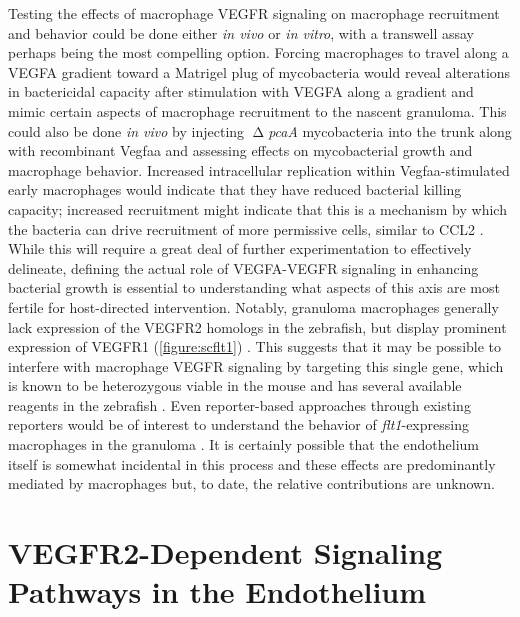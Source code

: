Testing the effects of macrophage VEGFR signaling on macrophage recruitment and behavior could be done either \textit{in vivo} or \textit{in vitro}, with a transwell assay perhaps being the most compelling option. Forcing macrophages to travel along a VEGFA gradient toward a Matrigel plug of mycobacteria would reveal alterations in bactericidal capacity after stimulation with VEGFA along a gradient and mimic certain aspects of macrophage recruitment to the nascent granuloma. This could also be done \textit{in vivo} by injecting $\upDelta$\textit{pcaA} mycobacteria into the trunk along with recombinant Vegfaa and assessing effects on mycobacterial growth and macrophage behavior. Increased intracellular replication within Vegfaa\hyp{}stimulated early macrophages would indicate that they have reduced bacterial killing capacity; increased recruitment might indicate that this is a mechanism by which the bacteria can drive recruitment of more permissive cells, similar to CCL2 \citep{Cambier2014b, Cattin2015}. While this will require a great deal of further experimentation to effectively delineate, defining the actual role of VEGFA\hyp{}VEGFR signaling in enhancing bacterial growth is essential to understanding what aspects of this axis are most fertile for host\hyp{}directed intervention. Notably, granuloma macrophages generally lack expression of the VEGFR2 homologs in the zebrafish, but display prominent expression of VEGFR1 (\autoref{figure:scflt1}) \citep{Cronan2021}. This suggests that it may be possible to interfere with macrophage VEGFR signaling by targeting this single gene, which is known to be heterozygous viable in the mouse and has several available reagents in the zebrafish \citep{Wild2017, Thirunavukkarasu2007, Ho2015, Habeck2002, Krueger2011}. Even reporter-based approaches through existing reporters would be of interest to understand the behavior of \textit{flt1}-expressing macrophages in the granuloma \citep{Krueger2011}. It is certainly possible that the endothelium itself is somewhat incidental in this process and these effects are predominantly mediated by macrophages but, to date, the relative contributions are unknown. 

\section{VEGFR2\hyp{}Dependent Signaling Pathways in the Endothelium}

